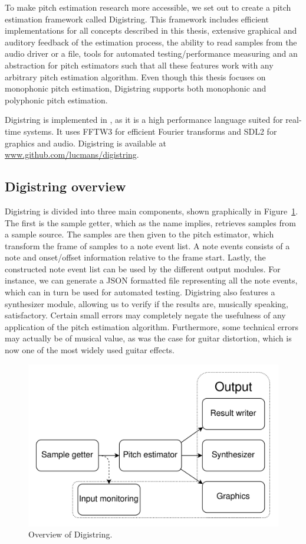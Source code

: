 \documentclass[a4paper,10pt,twocolumn]{article}
\begin{document}
To make pitch estimation research more accessible, we set out to create a pitch estimation framework called Digistring. This framework includes efficient implementations for all concepts described in this thesis, extensive graphical and auditory feedback of the estimation process, the ability to read samples from the audio driver or a file, tools for automated testing/performance measuring and an abstraction for pitch estimators such that all these features work with any arbitrary pitch estimation algorithm. Even though this thesis focuses on monophonic pitch estimation, Digistring supports both monophonic and polyphonic pitch estimation.

Digistring is implemented in \cpluspluslogo, as it is a high performance language suited for real-time systems. It uses FFTW3 for efficient Fourier transforms and SDL2 for graphics and audio. Digistring is available at \url{www.github.com/lucmans/digistring}.


\subsection{Digistring overview}
Digistring is divided into three main components, shown graphically in Figure~\ref{fig:digistring_overview}. The first is the sample getter, which as the name implies, retrieves samples from a sample source. The samples are then given to the pitch estimator, which transform the frame of samples to a note event list. A note events consists of a note and onset/offset information relative to the frame start. Lastly, the constructed note event list can be used by the different output modules. For instance, we can generate a JSON formatted file representing all the note events, which can in turn be used for automated testing. Digistring also features a synthesizer module, allowing us to verify if the results are, musically speaking, satisfactory. Certain small errors may completely negate the usefulness of any application of the pitch estimation algorithm. Furthermore, some technical errors may actually be of musical value, as was the case for guitar distortion, which is now one of the most widely used guitar effects.
\begin{figure}[h]
    \centering
    \includegraphics[width=\linewidth]{fig/digistring_overview.png}
    \caption{Overview of Digistring.}
    \label{fig:digistring_overview}
\end{figure}
\end{document}
